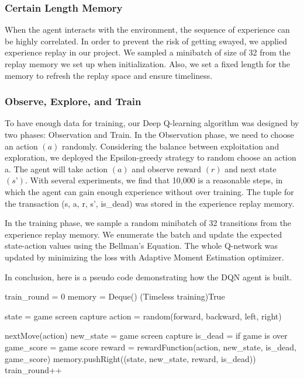 \documentclass{article}
\begin{document}
\subsubsection{Certain Length Memory}

When the agent interacts with the environment, the sequence of experience can be highly correlated. In order to prevent the risk of getting swayed, we applied experience replay in our project. We sampled a minibatch of size of 32 from the replay memory we set up when initialization. Also, we set a fixed length for the memory to refresh the replay space and ensure timeliness.

\subsubsection{Observe, Explore, and Train}
To have enough data for training, our Deep Q-learning algorithm was designed by two phases: Observation and Train. In the Observation phase, we need to choose an action $(a)$ randomly. Considering the balance between exploitation and exploration, we deployed the Epsilon-greedy strategy to random choose an action a. The agent will take action $(a)$ and observe reward $(r)$ and next state $(s’)$. With several experiments, we find that 10,000 is a reasonable steps, in which the agent can gain enough experience without over training. The tuple for the transaction (s, a, r, s’, is\_dead) was stored in the experience replay memory. 

In the training phase, we sample a random minibatch of 32 transitions from the experience replay memory. We enumerate the batch and update the expected state-action values using the Bellman’s Equation. The whole Q-network was updated by minimizing the loss with Adaptive Moment Estimation optimizer.

In conclusion, here is a pseudo code demonstrating how the DQN agent is built. 

\begin{algorithm}
train\_round = 0\;
memory = Deque()\;
\While(Timeless training){True} {
    state = game screen capture\;
     {
        action = random(forward, backward, left, right)\;
    }
    
    nextMove(action)\;
    new\_state = game screen capture\;
    is\_dead = if game is over\;
    game\_score = game score\;
    reward = rewardFunction(action, new\_state, is\_dead, game\_score)\;
    memory.pushRight((state, new\_state, reward, is\_dead))\;
    train\_round++\;
}
\end{algorithm}
\end{document}
